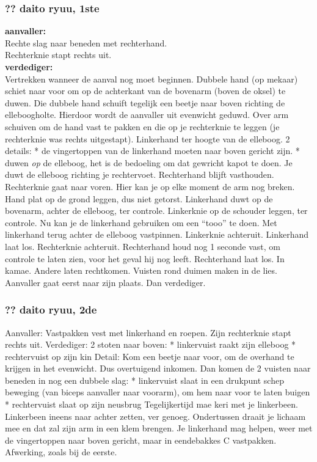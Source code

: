 \subsubsection{?? daito ryuu, 1ste}
\textbf{aanvaller:}\\
Rechte slag naar beneden met rechterhand.\\
Rechterknie stapt rechts uit.\\
\textbf{verdediger:}\\
Vertrekken wanneer de aanval nog moet beginnen.
Dubbele hand (op mekaar) schiet naar voor om op de achterkant van de bovenarm (boven de oksel) te duwen.
Die dubbele hand schuift tegelijk een beetje naar boven richting de elleboogholte.
Hierdoor wordt de aanvaller uit evenwicht geduwd.
Over arm schuiven om de hand vast te pakken en die op je rechterknie te leggen (je rechterknie was rechts uitgestapt).
Linkerhand ter hoogte van de elleboog.
2 details:
* de vingertoppen van de linkerhand moeten naar boven gericht zijn.
* duwen \textit{op} de elleboog, het is de bedoeling om dat gewricht kapot te doen.
Je duwt de elleboog richting je rechtervoet.
Rechterhand blijft vasthouden. Rechterknie gaat naar voren. Hier kan je op elke moment de arm nog breken.
Hand plat op de grond leggen, dus niet getorst.
Linkerhand duwt op de bovenarm, achter de elleboog, ter controle.
Linkerknie op de schouder leggen, ter controle.
Nu kan je de linkerhand gebruiken om een ``tooo'' te doen.
Met linkerhand terug achter de elleboog vastpinnen.
Linkerknie achteruit.
Linkerhand laat los.
Rechterknie achteruit.
Rechterhand houd nog 1 seconde vast, om controle te laten zien, voor het geval hij nog leeft.
Rechterhand laat los.
In kamae.
Andere laten rechtkomen.
Vuisten rond duimen maken in de lies.
Aanvaller gaat eerst naar zijn plaats.
Dan verdediger.

\subsubsection{?? daito ryuu, 2de}
Aanvaller:
Vastpakken vest met linkerhand en roepen.
Zijn rechterknie stapt rechts uit.
Verdediger:
2 stoten naar boven:
* linkervuist raakt zijn elleboog
* rechtervuist op zijn kin
Detail: Kom een beetje naar voor, om de overhand te krijgen in het evenwicht. Dus overtuigend inkomen.
Dan komen de 2 vuisten naar beneden in nog een dubbele slag:
* linkervuist slaat in een drukpunt schep beweging (van biceps aanvaller naar voorarm), om hem naar voor te laten buigen
* rechtervuist slaat op zijn neusbrug
Tegelijkertijd mae keri met je linkerbeen.
Linkerbeen ineens naar achter zetten, ver genoeg.
Ondertussen draait je lichaam mee en dat zal zijn arm in een klem brengen.
Je linkerhand mag helpen, weer met de vingertoppen naar boven gericht, maar in eendebakkes C vastpakken.
Afwerking, zoals bij de eerste.

